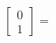 \documentclass[preview]{standalone}
\begin{document}
\begin{align*}
\begin{bmatrix} 0 \\ 1 \end{bmatrix} =
\end{align*}
\end{document}
